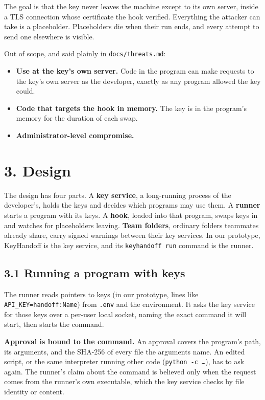 \documentclass[
  11pt]{article}
\providecommand{\tightlist}{%
  \setlength{\itemsep}{0pt}\setlength{\parskip}{0pt}}
\begin{document}
The goal is that the key never leaves
the machine except to its own server,
inside a TLS connection whose
certificate the hook verified.
Everything the attacker can take is a
placeholder. Placeholders die when their
run ends, and every attempt to send one
elsewhere is visible.

Out of scope, and said plainly in
\texttt{docs/threats.md}:

\begin{itemize}
\tightlist
\item
  \textbf{Use at the key's own server.}
  Code in the program can make requests
  to the key's own server as the
  developer, exactly as any program
  allowed the key could.
\item
  \textbf{Code that targets the hook in
  memory.} The key is in the program's
  memory for the duration of each swap.
\item
  \textbf{Administrator-level
  compromise.}
\end{itemize}

\section*{3. Design}\label{design}

The design has four parts. A \textbf{key
service}, a long-running process of the
developer's, holds the keys and decides
which programs may use them. A
\textbf{runner} starts a program with
its keys. A \textbf{hook}, loaded into
that program, swaps keys in and watches
for placeholders leaving. \textbf{Team
folders}, ordinary folders teammates
already share, carry signed warnings
between their key services. In our
prototype, KeyHandoff is the key
service, and its
\texttt{keyhandoff\ run} command is the
runner.

\subsection*{3.1 Running a program with
keys}\label{running-a-program-with-keys}

The runner reads pointers to keys (in
our prototype, lines like
\texttt{API\_KEY=handoff:Name}) from
\texttt{.env} and the environment. It
asks the key service for those keys over
a per-user local socket, naming the
exact command it will start, then starts
the command.

\textbf{Approval is bound to the
command.} An approval covers the
program's path, its arguments, and the
SHA-256 of every file the arguments
name. An edited script, or the same
interpreter running other code
(\texttt{python\ -c\ …}), has to ask
again. The runner's claim about the
command is believed only when the
request comes from the runner's own
executable, which the key service checks
by file identity or content.
\end{document}
